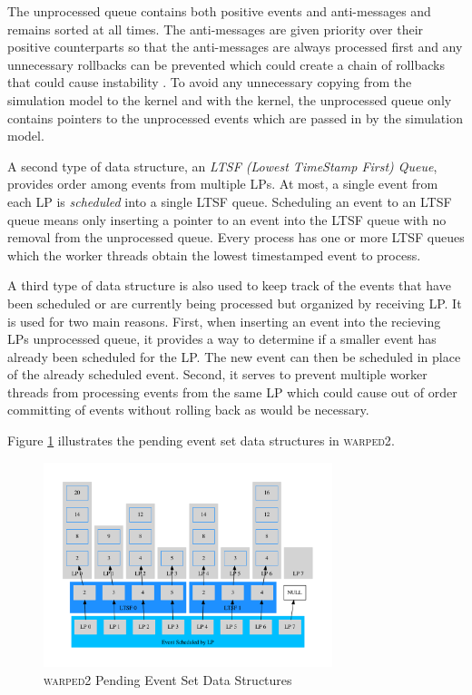 \documentclass[11pt]{book}
\begin{document}
The unprocessed queue contains both positive events and anti-messages and remains sorted at all
times. The anti-messages are given priority over their positive counterparts so that the
anti-messages are always processed first and any unnecessary rollbacks can be prevented which
could create a chain of rollbacks that could cause instability \cite{lubachevsky-89}. To avoid
any unnecessary copying from the simulation model to the kernel and with the kernel, the
unprocessed queue only contains pointers to the unprocessed events which are passed in by the
simulation model.

A second type of data structure, an \emph{LTSF (Lowest TimeStamp First) Queue}, provides
order among events from multiple LPs. At most, a single event from each LP is \emph{scheduled}
into a single LTSF queue. Scheduling an event to an LTSF queue means only inserting a pointer
to an event into the LTSF queue with no removal from the unprocessed queue. Every process has
one or more LTSF queues which the worker threads obtain the lowest timestamped event to process.

A third type of data structure is also used to keep track of the events that have been
scheduled or are currently being processed but organized by receiving LP. It is used for
two main reasons. First, when inserting an event into the recieving LPs unprocessed queue, it
provides a way to determine if a smaller event has already been scheduled for the LP. The new
event can then be scheduled in place of the already scheduled event. Second, it serves to
prevent multiple worker threads from processing events from the same LP which could cause
out of order committing of events without rolling back as would be necessary.

Figure \ref{pending_event_set} illustrates the pending event set data structures in
\textsc{warped2}.

\begin{figure}[H]
    \centering
    \includegraphics[width=0.75\textwidth,quiet]{figs/graphviz/pending_event_set.pdf}
    \caption{\textsc{warped2} Pending Event Set Data Structures}\label{pending_event_set}
\end{figure}
\end{document}
